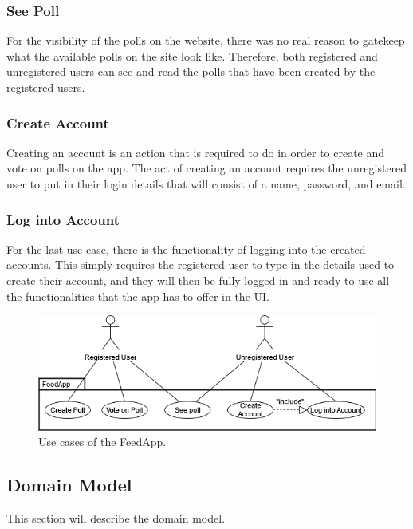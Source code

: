 \subsubsection{See Poll}
For the visibility of the polls on the website, there was no real reason to gatekeep what the available polls on the site look like. Therefore, both registered and unregistered users can see and read the polls that have been created by the registered users.

\subsubsection{Create Account}
Creating an account is an action that is required to do in order to create and vote on polls on the app. The act of creating an account requires the unregistered user to put in their login details that will consist of a name, password, and email.

\subsubsection{Log into Account}
For the last use case, there is the functionality of logging into the created accounts. This simply requires the registered user to type in the details used to create their account, and they will then be fully logged in and ready to use all the functionalities that the app has to offer in the UI.

\begin{figure}[thb]
	\centering
	\includegraphics[scale=0.5]{figs/usecases.png}
	\caption{Use cases of the FeedApp.}
	\label{fig:usecases}
\end{figure}

\subsection{Domain Model}
This section will describe the domain model.

